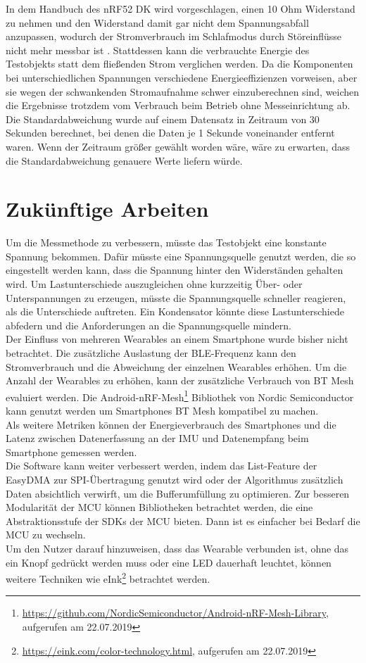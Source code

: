 In dem Handbuch des nRF52 DK wird vorgeschlagen, einen 10 Ohm Widerstand zu nehmen und den Widerstand damit gar nicht dem Spannungsabfall anzupassen, wodurch der Stromverbrauch im Schlafmodus durch Störeinflüsse nicht mehr messbar ist \cite{site_nrf52dk}.
Stattdessen kann die verbrauchte Energie des Testobjekts statt dem fließenden Strom verglichen werden.
Da die Komponenten bei unterschiedlichen Spannungen verschiedene Energieeffizienzen vorweisen, aber sie wegen der schwankenden Stromaufnahme schwer einzuberechnen sind, weichen die Ergebnisse trotzdem vom Verbrauch beim Betrieb ohne Messeinrichtung ab.\\
Die Standardabweichung wurde auf einem Datensatz in Zeitraum von 30 Sekunden berechnet, bei denen die Daten je 1 Sekunde voneinander entfernt waren.
Wenn der Zeitraum größer gewählt worden wäre, wäre zu erwarten, dass die Standardabweichung genauere Werte liefern würde.

\section{Zukünftige Arbeiten}
Um die Messmethode zu verbessern, müsste das Testobjekt eine konstante Spannung bekommen.
Dafür müsste eine Spannungsquelle genutzt werden, die so eingestellt werden kann, dass die Spannung hinter den Widerständen gehalten wird.
Um Lastunterschiede auszugleichen ohne kurzzeitig Über- oder Unterspannungen zu erzeugen, müsste die Spannungsquelle schneller reagieren, als die Unterschiede auftreten.
Ein Kondensator könnte diese Lastunterschiede abfedern und die Anforderungen an die Spannungsquelle mindern.\\
Der Einfluss von mehreren Wearables an einem Smartphone wurde bisher nicht betrachtet.
Die zusätzliche Auslastung der BLE-Frequenz kann den Stromverbrauch und die Abweichung der einzelnen Wearables erhöhen.
Um die Anzahl der Wearables zu erhöhen, kann der zusätzliche Verbrauch von BT Mesh evaluiert werden.
Die Android-nRF-Mesh\footnote{\url{https://github.com/NordicSemiconductor/Android-nRF-Mesh-Library}, aufgerufen am 22.07.2019} Bibliothek von Nordic Semiconductor kann genutzt werden um Smartphones BT Mesh kompatibel zu machen.\\
Als weitere Metriken können der Energieverbrauch des Smartphones und die Latenz zwischen Datenerfassung an der IMU und Datenempfang beim Smartphone gemessen werden.\\
Die Software kann weiter verbessert werden, indem das List-Feature der EasyDMA zur SPI-Übertragung \cite{datasheet_nrf52832} genutzt wird oder der Algorithmus zusätzlich Daten absichtlich verwirft, um die Bufferumfüllung zu optimieren.
Zur besseren Modularität der MCU können Bibliotheken betrachtet werden, die eine Abstraktionsstufe der SDKs der MCU bieten.
Dann ist es einfacher bei Bedarf die MCU zu wechseln.\\
Um den Nutzer darauf hinzuweisen, dass das Wearable verbunden ist, ohne das ein Knopf gedrückt werden muss oder eine LED dauerhaft leuchtet, können weitere Techniken wie eInk\footnote{\url{https://eink.com/color-technology.html}, aufgerufen am 22.07.2019} betrachtet werden.

